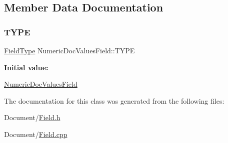 \subsection{Member Data Documentation}
\mbox{\label{classlucene_1_1core_1_1document_1_1NumericDocValuesField_a3d911f68265bf4abfe3ce797650bb239}} 
\subsubsection{\texorpdfstring{T\+Y\+PE}{TYPE}}
{\footnotesize\ttfamily \mbox{\hyperlink{classlucene_1_1core_1_1document_1_1FieldType}{Field\+Type}} Numeric\+Doc\+Values\+Field\+::\+T\+Y\+PE\hspace{0.3cm}{\ttfamily [static]}}

{\bfseries Initial value\+:}
\begin{DoxyCode}
\DoxyCodeLine{= []() \{}
\DoxyCodeLine{\}()}
\end{DoxyCode}
\mbox{\hyperlink{classlucene_1_1core_1_1document_1_1NumericDocValuesField}{Numeric\+Doc\+Values\+Field}} 

The documentation for this class was generated from the following files\+:\begin{DoxyCompactItemize}
\item 
Document/\mbox{\hyperlink{Document_2Field_8h}{Field.\+h}}\item 
Document/\mbox{\hyperlink{Field_8cpp}{Field.\+cpp}}\end{DoxyCompactItemize}
